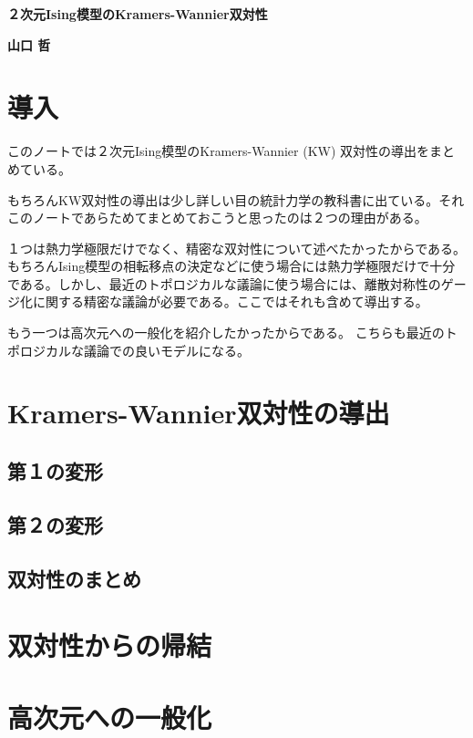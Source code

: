 \documentclass[a4paper,12pt,dvipdfmx]{jlreq}
\begin{document}
\begin{center}
  \textbf{\sffamily \LARGE ２次元Ising模型のKramers-Wannier双対性}
\end{center}

\begin{flushright}
  \textbf{\sffamily \Large 山口 哲}  
\end{flushright}

\section{導入}
このノートでは２次元Ising模型のKramers-Wannier (KW) 双対性\cite{Kramers:1941kn,Kramers:1941zz}の導出をまとめている。

もちろんKW双対性の導出は少し詳しい目の統計力学の教科書に出ている。それこのノートであらためてまとめておこうと思ったのは２つの理由がある。

１つは熱力学極限だけでなく、精密な双対性について述べたかったからである。もちろんIsing模型の相転移点の決定などに使う場合には熱力学極限だけで十分である。しかし、最近のトポロジカルな議論に使う場合には、離散対称性のゲージ化に関する精密な議論が必要である。ここではそれも含めて導出する。

もう一つは高次元への一般化を紹介したかったからである\cite{Wegner:1971app}。
こちらも最近のトポロジカルな議論での良いモデルになる。

\section{Kramers-Wannier双対性の導出}

\subsection{第１の変形}

\subsection{第２の変形}

\subsection{双対性のまとめ}

\section{双対性からの帰結}

\section{高次元への一般化}

\printbibliography
\end{document}
